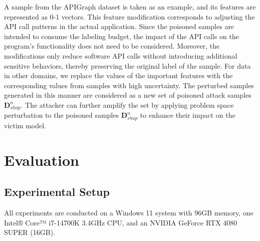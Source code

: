 \documentclass[lettersize,journal]{IEEEtran}
\begin{document}
A sample from the APIGraph dataset is taken as an example, and its features are represented as 0-1 vectors.
This feature modification corresponds to adjusting the API call patterns in the actual application.
Since the poisoned samples are intended to consume the labeling budget, the impact of the API calls on the program's functionality does not need to be considered.
Moreover, the modifications only reduce software API calls without introducing additional sensitive behaviors, thereby preserving the original label of the sample.
For data in other domains, we replace the values of the important features with the corresponding values from samples with high uncertainty.
The perturbed samples generated in this manner are considered as a new set of poisoned attack samples $\bm{D}_{shap}^{n}$.
The attacker can further amplify the set by applying problem space perturbation to the poisoned samples $\bm{D}_{shap}^{n}$ to enhance their impact on the victim model.

\section{Evaluation}
\label{Sec: Evaluation}

\subsection{Experimental Setup}
\label{Experimental Setup}
All experiments are conducted on a Windows 11 system with 96GB memory, one Intel® Core™ i7-14700K 3.4GHz CPU, and an NVIDIA GeForce RTX 4080 SUPER (16GB).
\end{document}
